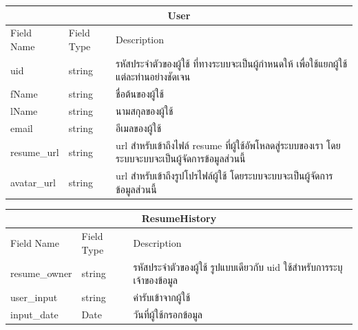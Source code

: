 \begin{table}[H]
  \begin{tabular*}{\textwidth}{l|l|p{}}
  \hline
  \multicolumn{3}{c}{User}                                                                                                      \\ \hline
  Field Name  & Field Type & Description                                                                                        \\ \hline
  uid         & string     & รหัสประจำตัวของผู้ใช้ ที่ทางระบบจะเป็นผู้กำหนดให้ เพื่อใช้แยกผู้ใช้แต่ละท่านอย่างชัดเจน            \\
  fName       & string     & ชื่อต้นของผู้ใช้                                                                                   \\
  lName       & string     & นามสกุลของผู้ใช้                                                                                   \\
  email       & string     & อีเมลของผู้ใช้                                                                                     \\
  resume\_url & string     & url สำหรับเข้าถึงไฟล์ resume ที่ผู้ใช้อัพโหลดสู่ระบบของเรา โดยระบบจะบบจะเป็นผู้จัดการข้อมูลส่วนนี้ \\
  avatar\_url & string     & url สำหรับเข้าถึงรูปโปรไฟล์ผู้ใช้ โดยระบบจะบบจะเป็นผู้จัดการข้อมูลส่วนนี้                          \\ \hline
  \end{tabular*}
\end{table}

\begin{table}[H]
  \begin{tabular*}{\textwidth}{l|l|p{}}
  \hline
  \multicolumn{3}{c}{ResumeHistory}                                                                   \\\hline
  Field Name    & Field Type & Description                                                            \\\hline
  resume\_owner & string     & รหัสประจำตัวของผู้ใช้ รูปแบบเดียวกับ uid ใช้สำหรับการระบุเจ้าของข้อมูล \\
  user\_input   & string     & ค่ารับเข้าจากผู้ใช้                                                    \\
  input\_date   & Date       & วันที่ผู้ใช้กรอกข้อมูล \\ \hline
  \end{tabular*}
\end{table}


